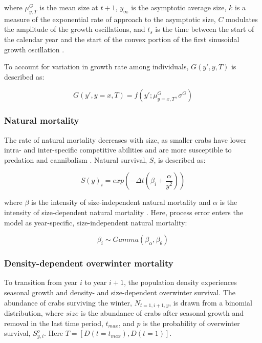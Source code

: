 \documentclass{article}
\begin{document}
where $\mu^G_{y,T}$ is the mean size at $t+1$, $y_{\infty}$ is the asymptotic average size, $k$ is a measure of the exponential rate of approach to the asymptotic size, $C$ modulates the amplitude of the growth oscillations, and $t_s$ is the time between the start of the calendar year and the start of the convex portion of the first sinusoidal growth oscillation \parencite{garcia2012technical}.

To account for variation in growth rate among individuals, $G(y',y, T)$ is described as:

\begin{equation}
G(y',y=x, T) = f(y'; \mu^G_{y=x, T}, \sigma^G)
\end{equation}

\subsubsection*{Natural mortality}

The rate of natural mortality decreases with size, as smaller crabs have lower intra- and inter-specific competitive abilities and are more susceptible to predation and cannibalism \parencite{maszczyk2018body, grosholz2021stage}. Natural survival, $S$, is described as: 

\begin{equation}
S(y)_i = exp(-\Delta t(\beta_i+\frac{\alpha}{y^2}))
\end{equation}

where $\beta$ is the intensity of size-independent natural mortality and $\alpha$ is the intensity of size-dependent natural mortality \parencite{carlson2010bayesian}. Here, process error enters the model as year-specific, size-independent natural mortality:

\begin{equation}
\beta_i \sim Gamma(\beta_{\alpha}, \beta_{\theta})
\end{equation}

\subsubsection*{Density-dependent overwinter mortality}

To transition from year $i$ to year $i+1$, the population density experiences seasonal growth and density- and size-dependent overwinter survival. The abundance of crabs surviving the winter, $N_{t=1,i+1,y}$, is drawn from a binomial distribution, where $size$ is the abundance of crabs after seasonal growth and removal in the last time period, $t_{max}$, and $p$ is the probability of overwinter survival, $S^o_{y,i}$. Here $T=[D(t=t_{max}), D(t=1)]$. 
\end{document}
